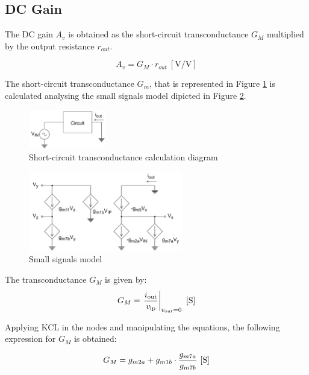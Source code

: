 \subsection {DC Gain}

The DC gain $A_v$ is obtained as the short-circuit transconductance $G_M$ multiplied by the output resistance $r_{out}$.

$$A_v = G_M \cdot r_{out}\ [\si{\volt/\volt}]$$

The short-circuit transconductance $G_m$, that is represented in Figure \ref{fig:cc_transconductance} is calculated analysing the small signals model dipicted in Figure \ref{fig:small_signals}.

\begin{figure}[H]
    \centering
    \includegraphics[width=0.3\textwidth]{Images/cc_transconductance.png}
    \caption{Short-circuit transconductance calculation diagram}
    \label{fig:cc_transconductance}
\end{figure}

\begin{figure}[H]
    \centering
    \includegraphics[width=0.6\textwidth]{Images/small_signals.png}
    \caption{Small signals model}
    \label{fig:small_signals}
\end{figure}

The transconductance $G_M$ is given by:
\begin{equation}
G_M = \left. \frac{i_{\text{out}}}{v_{\text{ip}}} \right|_{v_{\text{out}}=0} \ [\si{\siemens}] \\
\label{eq:Gm_general}
\end{equation}

Applying KCL in the nodes and manipulating the equations, the following expression for $G_M$ is obtained:

\begin{equation}
    G_M = g_{m2a} + g_{m1b} \cdot \frac{g_{m7a}}{g_{m7b}} \ [\si{\siemens}] \\
    \label{eq:GM_symbols}
\end{equation}

